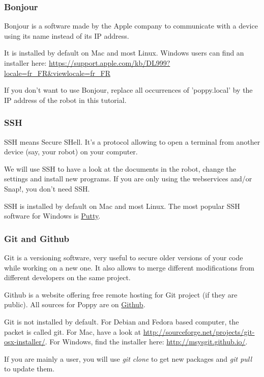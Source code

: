 \documentclass{article}
\begin{document}
\subsubsection{Bonjour}

Bonjour is a software made by the Apple company to communicate with a device using its name instead of its IP address.

It is installed by default on Mac and most Linux. Windows users can find an installer here: \url{https://support.apple.com/kb/DL999?locale=fr_FR&viewlocale=fr_FR}

If you don't want to use Bonjour, replace all occurrences of 'poppy.local' by the IP address of the robot in this tutorial.

\subsubsection{SSH}

SSH means Secure SHell. It's a protocol allowing to open a terminal from another device (say, your robot) on your computer.

We will use SSH to have a look at the documents in the robot, change the settings and install new programs. If you are only using the webservices and/or Snap!, you don't need SSH.

SSH is installed by default on Mac and most Linux. The most popular SSH software for Windows is \href{http://www.putty.org/}{Putty}.

\subsubsection{Git and Github}

Git is a versioning software, very useful to secure older versions of your code while working on a new one. It also allows to merge different modifications from different developers on the same project.

Github is a website offering free remote hosting for Git project (if they are public). All sources for Poppy are on \href{https://github.com/poppy-project}{Github}.

Git is not installed by default. For Debian and Fedora based computer, the packet is called git. For Mac, have a look at \url{http://sourceforge.net/projects/git-osx-installer/}. For Windows, find the installer here: \url{http://msysgit.github.io/}.

If you are mainly a user, you will use \textit{git clone} to get new packages and \textit{git pull} to update them.
\end{document}
